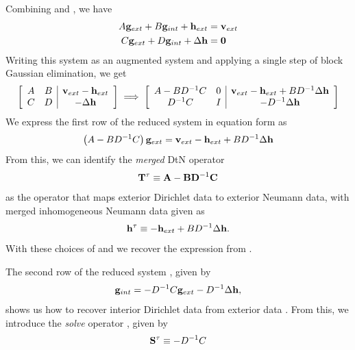 Combining  and , we have
\begin{equation}
\begin{aligned}
A\mathbf g_{ext} + B\mathbf g_{int} + \mathbf h_{ext} & = \mathbf v_{ext} \\
C\mathbf g_{ext} + D\mathbf g_{int} + \Delta \mathbf h & = \mathbf 0
\end{aligned}
\end{equation}
Writing this system as an augmented system and applying a single step of block Gaussian elimination, we get
\begin{equation}
\left[
\begin{array}{cc|c}
A & B & \mathbf v_{ext} - \mathbf h_{ext}\\
C & D & -\Delta \mathbf h\\
\end{array}\right]
\;
\Longrightarrow 
\;
\left[
\begin{array}{cc|c}
A - BD^{-1}C & 0 & \mathbf v_{ext} - \mathbf h_{ext} + B D^{-1}\Delta \mathbf h\\
D^{-1}C      & I & -D^{-1}\Delta \mathbf h
\end{array}\right]
\label{eq:reduced_system}
\end{equation}
We express the first row of the reduced system in equation form as 
\begin{equation}
\left(A - BD^{-1}C\right) \mathbf g_{ext} = \mathbf v_{ext} - \mathbf h_{ext} + B D^{-1}\Delta \mathbf h
\label{eq:complete_ops}
\end{equation}
From this, we can identify the {\em merged} DtN operator 
\begin{equation}
\mathbf T^{\tau} \equiv \mathbf{A} - \mathbf{B} \mathbf{D}^{-1} \mathbf{C} 
\label{eq:dtn_merge}
\end{equation}
as the operator that maps exterior Dirichlet data to exterior Neumann data, with merged inhomogeneous Neumann data given as
\begin{equation}
\mathbf h^{\tau} \equiv -\mathbf h_{ext} + B D^{-1}\Delta \mathbf h. 
\end{equation}
With these choices of \Ttau and \htau  we recover the expression from .

The second row of the reduced system , given by 
\begin{equation}
\mathbf g_{int} = -D^{-1}C \mathbf g_{ext} -D^{-1} \Delta \mathbf h,
\end{equation}
shows us how to recover interior Dirichlet data \gint  from exterior data \gext.  
From this, we introduce the {\em solve} operator \Stau, given by 
\begin{equation}
\mathbf S^{\tau} \equiv -D^{-1}C
\end{equation}


